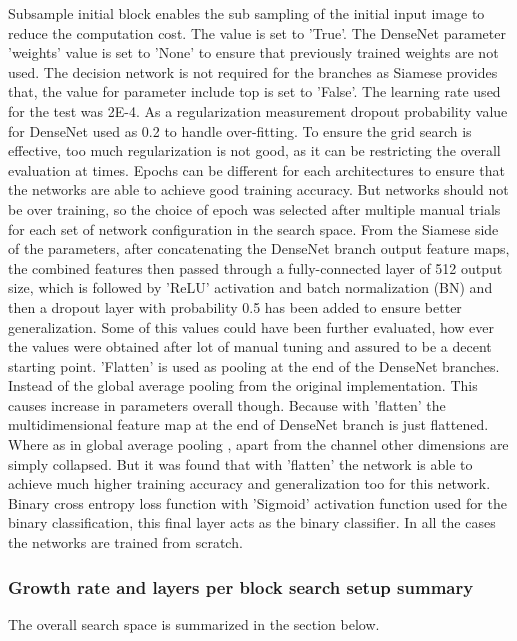  Subsample initial block enables the sub sampling of the initial input image to reduce the computation cost. The value is set to 'True'. The DenseNet parameter 'weights' value is set to 'None' to ensure that previously 
 trained weights are not used. The decision network is not required for the branches as Siamese provides that, the value for parameter include top is set to 'False'.
 The learning rate used for the test was 2E-4. As a regularization measurement dropout probability value for DenseNet used as 0.2 to handle over-fitting. To ensure the grid search is effective, too much regularization is not good, 
 as it can be restricting the overall evaluation at times. Epochs can be different for each architectures to ensure that the networks are able to achieve good training accuracy. But networks should not be over training, so the 
 choice of epoch was selected after multiple manual trials for each set of network configuration in the search space. From the Siamese side of the parameters, after concatenating the DenseNet branch output feature maps, 
 the combined features then passed through a fully-connected layer of 512 output size, which is followed by 'ReLU' activation and batch normalization (BN) and then a dropout layer with probability 0.5 has been added to ensure better 
 generalization. 
 Some of this values could have been further evaluated, how ever the values were obtained after lot of manual tuning and assured to be a decent starting point. 'Flatten' is used as pooling at the end of the DenseNet branches. Instead
 of the global average pooling from the original implementation. This causes increase in parameters overall though. Because with 'flatten' the multidimensional feature map at the end of DenseNet branch is just flattened. Where as in
 global average pooling \cite{lin2013network}, apart from the channel other dimensions are simply collapsed. But it was found that with 'flatten' the network is able to achieve much higher training accuracy and generalization too for 
 this network. Binary cross entropy loss function with 'Sigmoid' activation function used for the binary classification, this final layer acts as the binary classifier. In all the cases the networks are trained from scratch. 

\subsubsection{Growth rate and layers per block search setup summary}
The overall search space is summarized in the section below.
